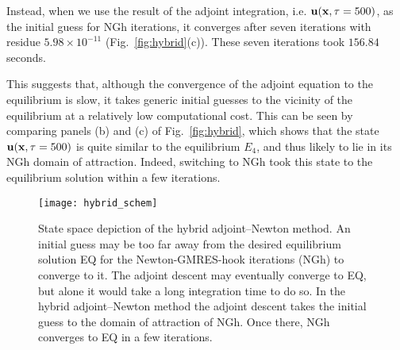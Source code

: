 \documentclass{jfm}
\begin{document}
Instead, when we use the result of the adjoint integration, i.e. $\mathbf u(\mathbf x,\tau=500)$, as the
initial guess for NGh iterations, it converges after seven iterations with residue
$5.98\times 10^{-11}$ (Fig.~\ref{fig:hybrid}(c)). These seven iterations took $156.84$ seconds.

This suggests that, although the convergence of the adjoint equation to the equilibrium is slow, it
takes generic initial guesses to the vicinity of the equilibrium at a relatively low computational
cost. This can be seen by comparing panels (b) and (c) of Fig.~\eqref{fig:hybrid}, which
shows that the state $\mathbf u(\mathbf x,\tau=500)$ is quite similar to the equilibrium $E_4$,
and thus likely to lie in its NGh domain of attraction. Indeed, switching to
NGh took this state to the equilibrium solution within a few iterations.

\begin{figure}
\centering
\texttt{[image: hybrid\_schem]}
\caption{
State space depiction of the hybrid adjoint--Newton method. An initial
guess may be too far away from the desired equilibrium solution EQ for
the Newton-GMRES-hook iterations (NGh) to converge to it. The adjoint
descent may eventually converge to EQ, but alone it would take a long
integration time to do so. In the hybrid adjoint--Newton method the
adjoint descent takes the initial guess to the domain of attraction of
NGh. Once there, NGh  converges to EQ in a few iterations.
}
\label{fig:hybrid_schem}
\end{figure}
\end{document}
